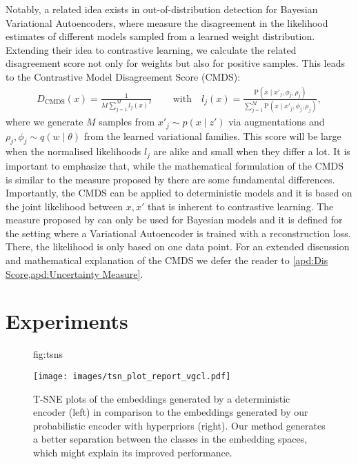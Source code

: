 \documentclass[tablecaption=bottom,wcp]{jmlr} %
\begin{document}
Notably, a related idea exists in out-of-distribution detection for Bayesian Variational Autoencoders, where \citet{BVAE} measure the disagreement in the likelihood estimates of different models sampled from a learned weight distribution. Extending their idea to contrastive learning, we calculate the related disagreement score not only for weights but also for positive samples. This leads to the Contrastive Model Disagreement Score (CMDS): 
%
 \begin{align}
D_{\text{CMDS}}\left(x\right)=\frac{1}{M\sum_{j=1}^{M} l_{j}(x)^2} \,  \qquad \text{with} \quad l_{j}(x)=\frac{\mathrm{P}\left(x \mid x'_{j}, \phi_{j}, \rho_{j} \right)}{\sum_{j=1}^{M} \mathrm{P}\left(x \mid x'_{j}, \phi_{j}, \rho_{j} \right)},
\end{align}
%
where we generate $M$ samples from $x'_{j} \sim  p(x\mid z')$ via augmentations and $\rho_{j}, \phi_{j} \sim q(w\mid \theta)$ from the learned variational families. This score will be large when the normalised likelihoods $l_{j}$ are alike and small when they differ a lot. It is important to emphasize that, while the mathematical formulation of the CMDS is similar to the measure proposed by \citet{BVAE} there are some fundamental differences. Importantly, the CMDS can be applied to deterministic models and it is based on the joint likelihood between $x,x'$ that is inherent to contrastive learning. The measure proposed by \citet{BVAE} can only be used for Bayesian models and it is defined for the setting where a Variational Autoencoder is trained with a reconstruction loss. There, the likelihood is only based on one data point. For an extended discussion and mathematical explanation of the CMDS we defer the reader to \cref{apd:Dis Score,apd:Uncertainty Measure}.
 

\section{Experiments}

\begin{figure}[t]
\floatconts
  {fig:tsns}
  {\caption{T-SNE plots of the embeddings generated by a deterministic encoder (left) in comparison to the embeddings generated by our probabilistic encoder with hyperpriors (right). Our method generates a better separation between the classes in the embedding spaces, which might explain its improved performance.}}
  {\texttt{[image: images/tsn\_plot\_report\_vgcl.pdf]}}
\end{figure}
\end{document}
